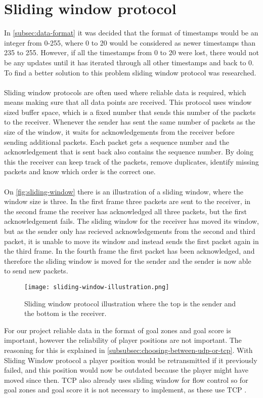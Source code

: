 \section{Sliding window protocol}
In \autoref{subsec:data-format} it was decided that the format of timestamps would be an integer from 0-255, where 0 to 20 would be considered as newer timestamps than 235 to 255.
However, if all the timestamps from 0 to 20 were lost, there would not be any updates until it has iterated through all other timestamps and back to 0.
To find a better solution to this problem sliding window protocol was researched.
\\\\
Sliding window protocols are often used where reliable data is required, which means making sure that all data points are received.
This protocol uses window sized buffer space, which is a fixed number that sends this number of the packets to the receiver.
Whenever the sender has sent the same number of packets as the size of the window, it waits for acknowledgements from the receiver before sending additional packets.
Each packet gets a sequence number and the acknowledgement that is sent back also contains the sequence number.
By doing this the receiver can keep track of the packets, remove duplicates, identify missing packets and know which order is the correct one.
\\\\
On \autoref{fig:sliding-window} there is an illustration of a sliding window, where the window size is three.
In the first frame three packets are sent to the receiver, in the second frame the receiver has acknowledged all three packets, but the first acknowledgement fails.
The sliding window for the receiver has moved its window, but as the sender only has recieved acknowledgements from the second and third packet, it is unable to move its window and instead sends the first packet again in the third frame.
In the fourth frame the first packet has been acknowledged, and therefore the sliding window is moved for the sender and the sender is now able to send new packets.
\begin{figure}[H]
    \centering
    \texttt{[image: sliding-window-illustration.png]}
    \caption{Sliding window protocol illustration where the top is the sender and the bottom is the receiver.}
    \label{fig:sliding-window}
\end{figure}
\noindent
For our project reliable data in the format of goal zones and goal score is important, however the reliability of player positions are not important.
The reasoning for this is explained in \autoref{subsubsec:choosing-between-udp-or-tcp}.
With Sliding Window protocol a player position would be retransmitted if it previously failed, and this position would now be outdated because the player might have moved since then.
TCP also already uses sliding window for flow control so for goal zones and goal score it is not necessary to implement, as these use TCP \cite{ibm:sliding-window}.
